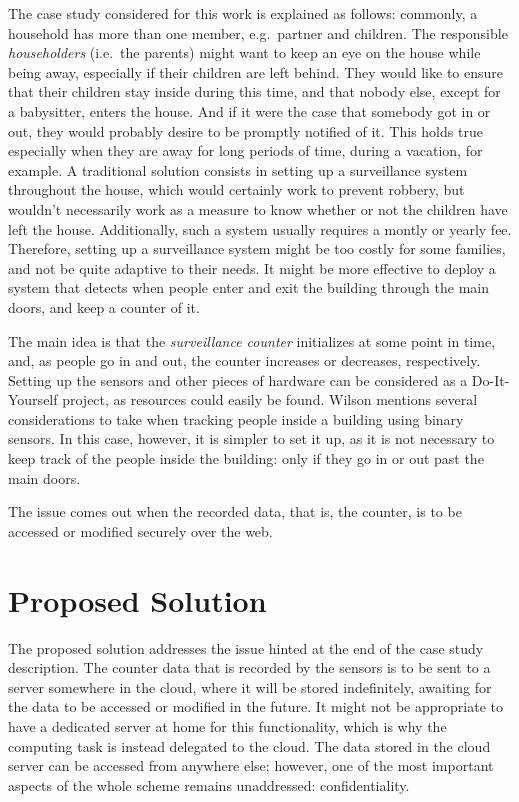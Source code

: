 The case study considered for this work is explained as follows: commonly, a household has more than one member, e.g.\ partner and children. The responsible \emph{householders} (i.e.\ the parents) might want to keep an eye on the house while being away, especially if their children are left behind. They would like to ensure that their children stay inside during this time, and that nobody else, except for a babysitter, enters the house. And if it were the case that somebody got in or out, they would probably desire to be promptly notified of it. This holds true especially when they are away for long periods of time, during a vacation, for example. A traditional solution consists in setting up a surveillance system throughout the house, which would certainly work to prevent robbery, but wouldn't necessarily work as a measure to know whether or not the children have left the house. Additionally, such a system usually requires a montly or yearly fee. Therefore, setting up a surveillance system might be too costly for some families, and not be quite adaptive to their needs. It might be more effective to deploy a system that detects when people enter and exit the building through the main doors, and keep a counter of it. 

The main idea is that the \emph{surveillance counter} initializes at some point in time, and, as people go in and out, the counter increases or decreases, respectively. Setting up the sensors and other pieces of hardware can be considered as a Do-It-Yourself project, as resources could easily be found. Wilson \cite{wilson2005simultaneous} mentions several considerations to take when tracking people inside a building using binary sensors. In this case, however, it is simpler to set it up, as it is not necessary to keep track of the people inside the building: only if they go in or out past the main doors. 

The issue comes out when the recorded data, that is, the counter, is to be accessed or modified securely over the web. 

\section{{Proposed Solution}}

The proposed solution addresses the issue hinted at the end of the case study description. The counter data that is recorded by the sensors is to be sent to a server somewhere in the cloud, where it will be stored indefinitely, awaiting for the data to be accessed or modified in the future. It might not be appropriate to have a dedicated server at home for this functionality, which is why the computing task is instead delegated to the cloud. The data stored in the cloud server can be accessed from anywhere else; however, one of the most important aspects of the whole scheme remains unaddressed: confidentiality.


